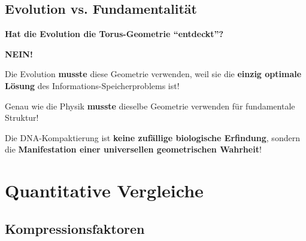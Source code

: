 	\subsection{Evolution vs. Fundamentalität}
	
	\begin{revolutionary}
		\textbf{Hat die Evolution die Torus-Geometrie ``entdeckt''?}
		
		\vspace{0.3cm}
		
		\textbf{NEIN!}
		
		\vspace{0.3cm}
		
		Die Evolution \textbf{musste} diese Geometrie verwenden, weil sie die \textbf{einzig optimale Lösung} des Informations-Speicherproblems ist!
		
		\vspace{0.3cm}
		
		Genau wie die Physik \textbf{musste} dieselbe Geometrie verwenden für fundamentale Struktur!
		
		\vspace{0.3cm}
		
		Die DNA-Kompaktierung ist \textbf{keine zufällige biologische Erfindung}, sondern die \textbf{Manifestation einer universellen geometrischen Wahrheit}!
	\end{revolutionary}
	
	\section{Quantitative Vergleiche}
	
	\subsection{Kompressionsfaktoren}
	
	\begin{table}[H]
		\centering
		\caption{Kompressionsfaktoren}
	\end{table}
	

